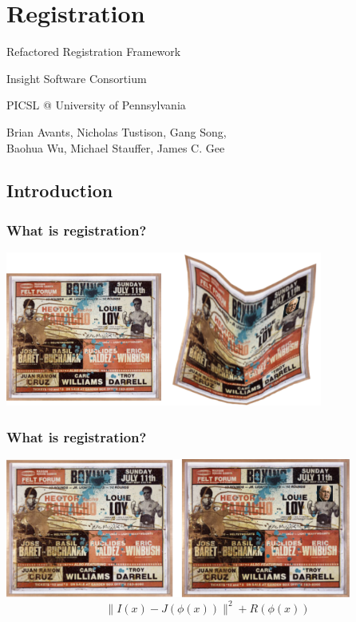 \section{Registration}

{
\color{white}
\begin{frame}[plain]
\fontsize{36pt}{36pt}\selectfont
\center
\begin{center}
Refactored Registration Framework
\end{center}

\fontsize{12pt}{12pt}\selectfont
\begin{center}
Insight Software Consortium
\end{center}
\vskip12pt
\begin{center}
 PICSL @ University of Pennsylvania 
\end{center}
\vskip12pt
\begin{center}
 Brian Avants, Nicholas Tustison, Gang Song, \\ 
Baohua Wu, Michael Stauffer, James C. Gee
\end{center}
\end{frame}
}

\subsection{Introduction}

\begin{frame}
\frametitle{What is registration?}
\includegraphics[height=2in]{../Art/RegistrationBasquiatWarp.pdf}
\end{frame}

\begin{frame}
\frametitle{What is registration?}
\includegraphics[height=1.8in]{../Art/RegistrationBasquiatDeWarp.pdf}
\vskip20pt
\begin{displaymath}
\| I ( x ) - J(\phi(x)) \|^2  + R(\phi( x))
\end{displaymath}
\end{frame}

